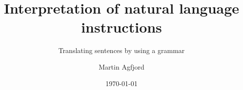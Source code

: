 \documentclass{beamer}
\begin{document}
\title[Interpretation of natural language instructions]{Interpretation of natural language instructions} 
\subtitle{Translating sentences by using a grammar}
\author{Martin Agfjord} 
\date{\today} 










\end{document}

